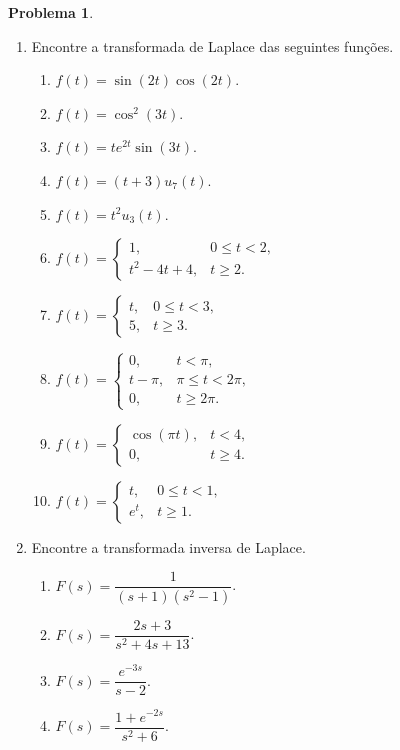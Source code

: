 \documentclass[10pt,a4paper]{amsart}
\theoremstyle{definition}
\newtheorem{problema}{Problema}
\begin{document}
\begin{problema}
\begin{enumerate}
    \item Encontre a transformada de Laplace das seguintes funções.
    \begin{enumerate}[label=(\alph*)]
        \item $f(t)=\sin(2t)\cos(2t)$.
        \item $f(t)=\cos^2(3t)$.
        \item $f(t)=t e^{2t}\sin(3t)$.
        \item $f(t)=(t+3)u_7(t)$.
        \item $f(t)=t^2u_3(t)$.
        \item $f(t)=\begin{cases}1, & 0\le t<2,\\ t^2-4t+4, & t\ge 2.\end{cases}$
        \item $f(t)=\begin{cases}t, & 0\le t<3,\\ 5, & t\ge 3.\end{cases}$
        \item $f(t)=\begin{cases}0, & t<\pi,\\ t-\pi, & \pi\le t<2\pi,\\ 0, & t\ge 2\pi.\end{cases}$
        \item $f(t)=\begin{cases}\cos(\pi t), & t<4,\\ 0, & t\ge 4.\end{cases}$
        \item $f(t)=\begin{cases}t, & 0\le t<1,\\ e^t, & t\ge 1.\end{cases}$
    \end{enumerate}
    \item Encontre a transformada inversa de Laplace.
    \begin{enumerate}[label=(\alph*)]
        \item $F(s)=\dfrac{1}{(s+1)(s^2-1)}$.
        \item $F(s)=\dfrac{2s+3}{s^2+4s+13}$.
        \item $F(s)=\dfrac{e^{-3s}}{s-2}$.
        \item $F(s)=\dfrac{1+e^{-2s}}{s^2+6}$.
    \end{enumerate}
\end{enumerate}
\end{problema}
\end{document}
